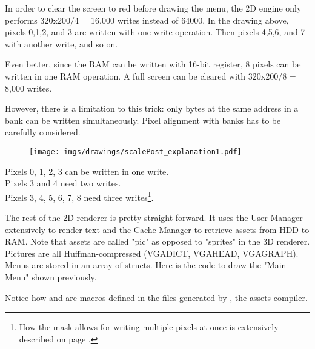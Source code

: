 \par
In order to clear the screen to red before drawing the menu, the 2D engine only performs 320x200/4 = 16,000 writes instead of 64000. In the drawing above, pixels 0,1,2, and 3 are written with one write operation. Then pixels 4,5,6, and 7 with another write, and so on.\\
\par
Even better, since the RAM can be written with 16-bit register, 8 pixels can be written in one RAM operation. A full screen can be cleared with 320x200/8 = 8,000 writes.
\par
\begin{minipage}{\textwidth}

\end{minipage}
However, there is a limitation to this trick: only bytes at the same address in a bank can be written simultaneously. Pixel alignment with banks has to be carefully considered.\
\par
\begin{figure}[H]
\centering
 \texttt{[image: imgs/drawings/scalePost\_explanation1.pdf]}
 
 \end{figure}
Pixels 0, 1, 2, 3 can be written in one write.\\
Pixels 3 and 4 need two writes.\\
Pixels 3, 4, 5, 6, 7, 8 need three writes\footnote{How the mask allows for writing multiple pixels at once is extensively described on page \pageref{simd_vga}.}.\\


\par
The rest of the 2D renderer is pretty straight forward. It uses the User Manager extensively to render text and the Cache Manager to retrieve assets from HDD to RAM. Note that assets are called "pic" as opposed to "sprites" in the 3D renderer. Pictures are all Huffman-compressed (VGADICT, VGAHEAD, VGAGRAPH). Menus are stored in an array of structs. Here is the code to draw the "Main Menu" shown previously.\\

\par
\begin{minipage}{\textwidth}

\end{minipage}

\par
\begin{minipage}{\textwidth}

\end{minipage}
\par
Notice how  and  are macros defined in the files generated by , the assets compiler.

